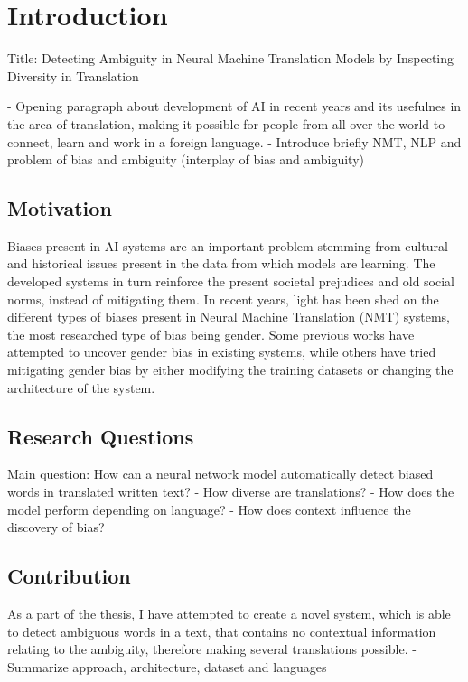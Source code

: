 \chapter{Introduction}
\label{ch:Introduction}

Title: Detecting Ambiguity in Neural Machine Translation Models by Inspecting Diversity in Translation

- Opening paragraph about development of AI in recent years and its usefulnes in the area of translation, making it possible for people from all over the world to connect, learn and work in a foreign language.
- Introduce briefly NMT, NLP and problem of bias and ambiguity (interplay of bias and ambiguity)

\section{Motivation}
\label{sec:Introduction:Motivation}

Biases present in AI systems are an important problem stemming from cultural and historical issues present in the data from which models are learning. The developed systems in turn reinforce the present societal prejudices and old social norms, instead of mitigating them.
In recent years, light has been shed on the different types of biases present in Neural Machine Translation (NMT) systems, the most researched type of bias being gender. Some previous works have attempted to uncover gender bias in existing systems, while others have tried mitigating gender bias by either modifying the training datasets or changing the architecture of the system.

\section{Research Questions}
\label{sec:Introduction:Questions}

Main question: How can a neural network model automatically detect biased words in translated written text?
-	How diverse are translations?
-	How does the model perform depending on language?
-	How does context influence the discovery of bias? 


\section{Contribution}
\label{sec:Introduction:Contribution}

As a part of the thesis, I have attempted to create a novel system, which is able to detect ambiguous words in a text, that contains no contextual information relating to the ambiguity, therefore making several translations possible. 
- Summarize approach, architecture, dataset and languages 

